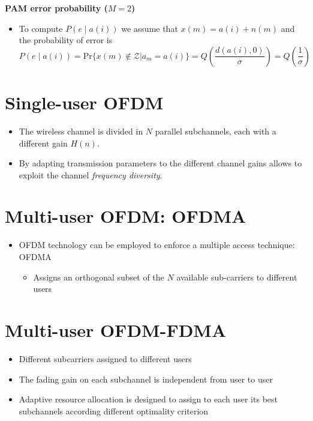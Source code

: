 \textbf{PAM error probability (\( M = 2 \))}
\begin{itemize}
    \item To compute \( P(e \mid a(i)) \) we assume that \( x(m) = a(i) + n(m) \) and the probability of error is
    \[ P(e \mid a(i)) = \text{Pr}\{x(m) \notin \mathcal{Z}|a_m = a(i)\} = Q\left(\frac{d(a(i), 0)}{\sigma}\right) = Q\left(\frac{1}{\sigma}\right) \]
\end{itemize}


\section*{Single-user OFDM}

\begin{itemize}
    \item The wireless channel is divided in \( N \) parallel subchannels, each with a different gain \( H(n) \).
    \item By adapting transmission parameters to the different channel gains allows to exploit the channel \textit{frequency diversity}.
\end{itemize}

\section*{Multi-user OFDM: OFDMA}

\begin{itemize}
    \item OFDM technology can be employed to enforce a multiple access technique: OFDMA
    \begin{itemize}
        \item Assigns an orthogonal subset of the \( N \) available sub-carriers to different users
    \end{itemize}
\end{itemize}


\section*{Multi-user OFDM-FDMA}

\begin{itemize}
    \item Different subcarriers assigned to different users
    \item The fading gain on each subchannel is independent from user to user
    \item Adaptive resource allocation is designed to assign to each user its best subchannels according different optimality criterion
\end{itemize}

